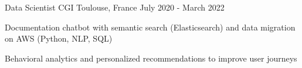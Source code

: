 \begin{cventries}

\cventry
{Data Scientist} %
{CGI} %
{Toulouse, France} %
{July 2020 - March 2022} %
{ %
\begin{cvitems}
\item {Documentation chatbot with semantic search (Elasticsearch) and data migration on AWS (Python, NLP, SQL)}
\item {Behavioral analytics and personalized recommendations to improve user journeys}
\end{cvitems}
}


\end{cventries}
